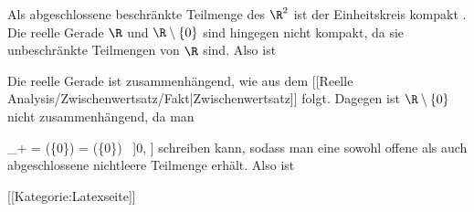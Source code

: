 Als abgeschlossene beschränkte Teilmenge des $\R^2$ ist der Einheitskreis kompakt
 {} {.} Die reelle Gerade $\R$ und $\R \setminus \{0\}$ sind hingegen nicht kompakt, da sie unbeschränkte Teilmengen von $\R$ sind. Also ist

Die reelle Gerade ist zusammenhängend, wie aus dem
[[Reelle Analysis/Zwischenwertsatz/Fakt|Zwischenwertsatz]]
folgt. Dagegen ist $\R \setminus \{0\}$ nicht zusammenhängend, da man

\mavergleichskettedisp
{\vergleichskette
{\R_+
}
{ =} {(\R \setminus \{0\}) \cap [0, \infty]
}
{ =} {(\R \setminus \{0\}) \cap \, ]0, \infty]
}
{ } {
}
{ } {
}
}
{}{}{}
schreiben kann, sodass man eine sowohl offene als auch abgeschlossene nichtleere Teilmenge erhält. Also ist

 [[Kategorie:Latexseite]]
